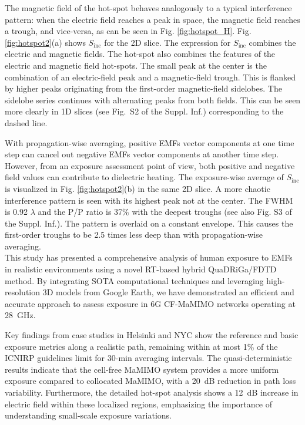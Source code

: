 \documentclass{IEEEtran}
\begin{document}
The magnetic field of the hot-spot behaves analogously to a typical interference pattern: when the electric field reaches a peak in space, the magnetic field reaches a trough, and vice-versa, as can be seen in Fig. \ref{fig:hotspot_H}. Fig. \ref{fig:hotspot2}(a) shows $S_\mathrm{inc}$ for the 2D slice. The expression for $S_\mathrm{inc}$ combines the electric and magnetic fields. The hot-spot also combines the features of the electric and magnetic field hot-spots. The small peak at the center is the combination of an electric-field peak and a magnetic-field trough. This is flanked by higher peaks originating from the first-order magnetic-field sidelobes. The sidelobe series continues with alternating peaks from both fields. This can be seen more clearly in 1D slices (see Fig.~S2 of the Suppl. Inf.) corresponding to the dashed line. 

With propagation-wise averaging, positive EMFs vector components at one time step can cancel out negative EMFs vector components at another time step. However, from an exposure assessment point of view, both positive and negative field values can contribute to dielectric heating. The exposure-wise average of $S_\mathrm{inc}$ is visualized in Fig. \ref{fig:hotspot2}(b) in the same 2D slice. A more chaotic interference pattern is seen with its highest peak not at the center. The \gls{FWHM} is 0.92 $\lambda$ and the \gls{P/P} ratio is 37\% with the deepest troughs (see also Fig. S3 of the Suppl. Inf.). The pattern is overlaid on a constant envelope. This causes the first-order troughs to be 2.5 times less deep than with propagation-wise averaging. \\

This study has presented a comprehensive analysis of human exposure to \glspl{EMF} in realistic environments using a novel \gls{RT}-based hybrid \gls{QuaDRiGa}/\gls{FDTD} method. By integrating \gls{SOTA} computational techniques and leveraging high-resolution 3D models from Google Earth, we have demonstrated an efficient and accurate approach to assess exposure in \gls{6G} \gls{CF-MaMIMO} networks operating at 28~GHz.

Key findings from case studies in Helsinki and \gls{NYC} show the reference and basic exposure metrics along a realistic path, remaining within at most 1\% of the ICNIRP guidelines limit for 30-min averaging intervals. The quasi-deterministic results indicate that the cell-free \gls{MaMIMO} system provides a more uniform exposure compared to collocated \gls{MaMIMO}, with a 20~dB reduction in path loss variability. Furthermore, the detailed hot-spot analysis shows a 12~dB increase in electric field within these localized regions, emphasizing the importance of understanding small-scale exposure variations.
\end{document}
